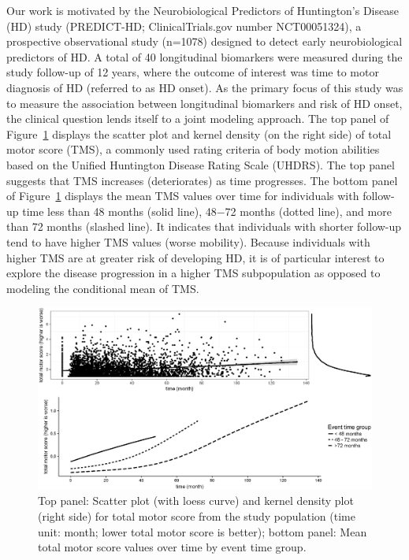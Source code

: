 \documentclass[Crown, sagev, times, doublespace]{sagej}
\begin{document}
Our work is motivated by the Neurobiological Predictors of Huntington's Disease (HD) study (PREDICT-HD; ClinicalTrials.gov number NCT00051324), a prospective observational study (n=1078) designed to detect early neurobiological predictors of HD. A total of 40 longitudinal biomarkers were measured during the study follow-up of 12 years, where the outcome of interest was time to motor diagnosis of HD (referred to as HD onset). As the primary focus of this study was to measure the association between longitudinal biomarkers and risk of HD onset, the clinical question lends itself to a joint modeling approach. The top panel of Figure~\ref{fig:data_neurotot} displays the scatter plot and kernel density (on the right side) of total motor score (TMS), a commonly used rating criteria of body motion abilities based on the Unified Huntington Disease Rating Scale (UHDRS). The top panel suggests that TMS increases (deteriorates) as time progresses. The bottom panel of Figure~\ref{fig:data_neurotot} displays the mean TMS values over time for individuals with follow-up time less than 48 months (solid line), 48$-$72 months (dotted line), and more than 72 months (slashed line). It indicates that individuals with shorter follow-up tend to have higher TMS values (worse mobility). Because individuals with higher TMS are at greater risk of developing HD, it is of particular interest to explore the disease progression in a higher TMS subpopulation as opposed to modeling the conditional mean of TMS.

\begin{figure}[ht]
\centering
\includegraphics[width=1\textwidth]{TMS_bw.eps}
\caption{Top panel: Scatter plot (with loess curve) and kernel density plot (right side) for {total motor score} from the study population (time unit: month; lower total motor score is better); bottom panel: Mean total motor score values over time by event time group.}
\label{fig:data_neurotot}
\end{figure}
\end{document}
